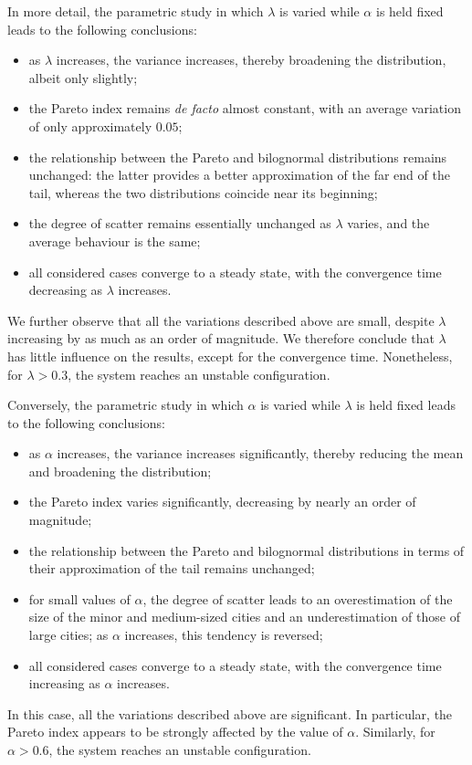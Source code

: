 \documentclass[a4paper]{article}
\begin{document}
In more detail, the parametric study in which $\lambda$ is varied while $\alpha$ is held fixed leads to the following conclusions:
\begin{itemize}
\item as $\lambda$ increases, the variance increases, thereby broadening the distribution, albeit only slightly;
\item the Pareto index remains \textit{de facto} almost constant, with an average variation of only approximately $0.05$;
\item the relationship between the Pareto and bilognormal distributions remains unchanged: the latter provides a better approximation of the far end of the tail, whereas the two distributions coincide near its beginning;
\item the degree of scatter remains essentially unchanged as $\lambda$ varies, and the average behaviour is the same;
\item all considered cases converge to a steady state, with the convergence time decreasing as $\lambda$ increases.
\end{itemize}
We further observe that all the variations described above are small, despite $\lambda$ increasing by as much as an order of magnitude. We therefore conclude that $\lambda$ has little influence on the results, except for the convergence time. Nonetheless, for $\lambda>0.3$, the system reaches an unstable configuration.

Conversely, the parametric study in which $\alpha$ is varied while $\lambda$ is held fixed leads to the following conclusions:
\begin{itemize}
\item as $\alpha$ increases, the variance increases significantly, thereby reducing the mean and broadening the distribution;
\item the Pareto index varies significantly, decreasing by nearly an order of magnitude;
\item the relationship between the Pareto and bilognormal distributions in terms of their approximation of the tail remains unchanged;
\item for small values of $\alpha$, the degree of scatter leads to an overestimation of the size of the minor and medium-sized cities and an underestimation of those of large cities; as $\alpha$ increases, this tendency is reversed;
\item all considered cases converge to a steady state, with the convergence time increasing as $\alpha$ increases.
\end{itemize}
In this case, all the variations described above are significant. In particular, the Pareto index appears to be strongly affected by the value of $\alpha$. Similarly, for $\alpha>0.6$, the system reaches an unstable configuration.
\end{document}
